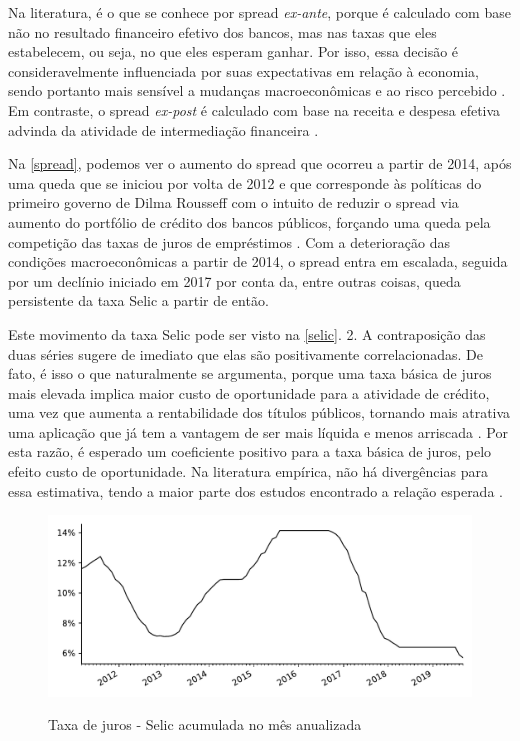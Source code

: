 \documentclass[a4paper,
               article,
               12pt,
               openany,
               oneside,
               english,
               brazil]{abntex2}
\numberwithin{equation}{section}
\begin{document}
    Na literatura, é o que se conhece por spread \textit{ex-ante}, porque é calculado com base não no resultado financeiro efetivo dos bancos, mas nas taxas que eles estabelecem, ou seja, no que eles esperam ganhar. Por isso, essa decisão é consideravelmente influenciada por suas expectativas em relação à economia, sendo portanto mais sensível a mudanças macroeconômicas e ao risco percebido \cite[p.~226]{leal07}. Em contraste, o spread \textit{ex-post} é calculado com base na receita e despesa efetiva advinda da atividade de intermediação financeira \cite[p.~2]{almeida15}. 
    
    Na \autoref{spread}, podemos ver o aumento do spread que ocorreu a partir de 2014, após uma queda que se iniciou por volta de 2012 e que corresponde às políticas do primeiro governo de Dilma Rousseff com o intuito de reduzir o spread via aumento do portfólio de crédito dos bancos públicos, forçando uma queda pela competição das taxas de juros de empréstimos \cite[p.~1]{almeida15}. Com a deterioração das condições macroeconômicas a partir de 2014, o spread entra em escalada, seguida por um declínio iniciado em 2017 por conta da, entre outras coisas, queda persistente da taxa Selic a partir de então.

    Este movimento da taxa Selic pode ser visto na \autoref{selic}. 2. A contraposição das duas séries sugere de imediato que elas são positivamente correlacionadas. De fato, é isso o que naturalmente se argumenta, porque uma taxa básica de juros mais elevada implica maior custo de oportunidade para a atividade de crédito, uma vez que aumenta a rentabilidade dos títulos públicos, tornando mais atrativa uma aplicação que já tem a vantagem de ser mais líquida e menos arriscada \cite[p.~372]{oliveira2007}. Por esta razão, é esperado um coeficiente positivo para a taxa básica de juros, pelo efeito custo de oportunidade. Na literatura empírica, não há divergências para essa estimativa, tendo a maior parte dos estudos encontrado a relação esperada \cite[p.~233-234]{leal07}.

    \begin{figure}[h]
        \centering
        \caption{Taxa de juros - Selic acumulada no mês anualizada}
        \includegraphics[width = \textwidth, scale=0.75]{selic.pdf}
        \label{selic}
    \end{figure}
\end{document}
